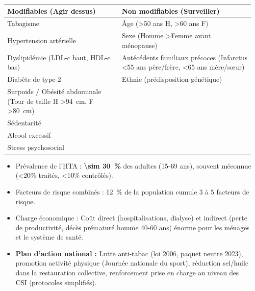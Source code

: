\documentclass[11pt]{article}
\begin{document}
\begin{aretenir}
\begin{center}
\begin{tabularx}{\linewidth}{|l|X|}
\hline
\rowcolor{popblueL} \textbf{Modifiables (Agir dessus)} & \textbf{Non modifiables (Surveiller)} \\
\hline
Tabagisme & Âge (\textgreater 50 ans H, \textgreater 60 ans F) \\
Hypertension artérielle & Sexe (Homme \textgreater Femme avant ménopause) \\
Dyslipidémie (LDL-c haut, HDL-c bas) & Antécédents familiaux précoces (Infarctus \textless 55 ans père/frère, \textless 65 ans mère/sœur) \\
Diabète de type 2 & Ethnie (prédisposition génétique) \\
Surpoids / Obésité abdominale (Tour de taille H \textgreater \SI{94}{cm}, F \textgreater \SI{80}{cm}) & \\
Sédentarité & \\
Alcool excessif & \\
Stress psychosocial & \\
\hline
\end{tabularx}
\end{center}
\end{aretenir}

\begin{savaistu}
\begin{itemize}
\item Prévalence de l'HTA : \textbf{\SI{\sim 30}{\%}} des adultes (15-69 ans), souvent méconnue (\textless 20\% traités, \textless 10\% contrôlés).
\item Facteurs de risque combinés : \SI{12}{\%} de la population cumule 3 à 5 facteurs de risque.
\item Charge économique : Coût direct (hospitalisations, dialyse) et indirect (perte de productivité, décès prématuré homme 40-60 ans) énorme pour les ménages et le système de santé.
\item \textbf{Plan d'action national :} Lutte anti-tabac (loi 2006, paquet neutre 2023), promotion activité physique (Journée nationale du sport), réduction sel/huile dans la restauration collective, renforcement prise en charge au niveau des CSI (protocoles simplifiés).
\end{itemize}
\end{savaistu}
\end{document}
